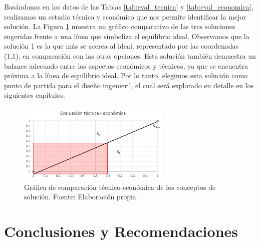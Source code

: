 Basándonos en los datos de las Tablas \ref{tab:eval_tecnica} y \ref{tab:eval_economica}, realizamos un estudio técnico y económico que nos permite identificar la mejor solución. La Figura \ref{fig:comp_tecnico_economica} muestra un gráfico comparativo de las tres soluciones sugeridas frente a una línea que simboliza el equilibrio ideal. Observamos que la solución 1 es la que más se acerca al ideal, representado por las coordenadas (1,1), en comparación con las otras opciones. Esta solución también demuestra un balance adecuado entre los aspectos económicos y técnicos, ya que se encuentra próxima a la línea de equilibrio ideal. Por lo tanto, elegimos esta solución como punto de partida para el diseño ingenieril, el cual será explorado en detalle en los siguientes capítulos.

\begin{figure}[H]
	\centering
	\includegraphics[width=0.65\textwidth]{img/comp_tecnico_economica.png}
	\caption[Gráfica de comparación técnico-económica de los conceptos de solución.]{Gráfica de comparación técnico-económica de los conceptos de solución. Fuente: Elaboración propia.}
	\label{fig:comp_tecnico_economica}
\end{figure}

\chapter*{Conclusiones y Recomendaciones}


